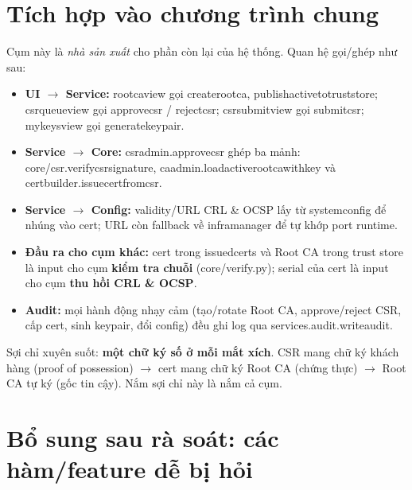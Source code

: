 \documentclass[12pt,a4paper]{article}
\newcommand{\code}[1]{{\ttfamily\small\def\_{\textunderscore\discretionary{}{}{}}#1}}
\begin{document}
\section{Tích hợp vào chương trình chung}

Cụm này là \emph{nhà sản xuất} cho phần còn lại của hệ thống. Quan hệ gọi/ghép
như sau:

\begin{itemize}
  \item \textbf{UI $\to$ Service:} \code{root\_ca\_view} gọi \code{create\_root\_ca},
        \code{publish\_active\_to\_trust\_store}; \code{csr\_queue\_view} gọi
        \code{approve\_csr} / \code{reject\_csr}; \code{csr\_submit\_view} gọi
        \code{submit\_csr}; \code{my\_keys\_view} gọi \code{generate\_keypair}.
  \item \textbf{Service $\to$ Core:} \code{csr\_admin.approve\_csr} ghép ba mảnh:
        \code{core/csr.verify\_csr\_signature},
        \code{ca\_admin.load\_active\_root\_ca\_with\_key} và
        \code{cert\_builder.issue\_cert\_from\_csr}.
  \item \textbf{Service $\to$ Config:} validity/URL CRL \& OCSP lấy từ
        \code{system\_config} để nhúng vào cert; URL còn fallback về
        \code{infra\_manager} để tự khớp port runtime.
  \item \textbf{Đầu ra cho cụm khác:} cert trong \code{issued\_certs} và Root CA
        trong trust store là input cho cụm \textbf{kiểm tra chuỗi}
        (\code{core/verify.py}); serial của cert là input cho cụm \textbf{thu
        hồi CRL \& OCSP}.
  \item \textbf{Audit:} mọi hành động nhạy cảm (tạo/rotate Root CA, approve/reject
        CSR, cấp cert, sinh keypair, đổi config) đều ghi log qua
        \code{services.audit.write\_audit}.
\end{itemize}

\begin{notebox}
Sợi chỉ xuyên suốt: \textbf{một chữ ký số ở mỗi mắt xích}. CSR mang chữ ký khách
hàng (proof of possession) $\to$ cert mang chữ ký Root CA (chứng thực) $\to$ Root
CA tự ký (gốc tin cậy). Nắm sợi chỉ này là nắm cả cụm.
\end{notebox}

\section{Bổ sung sau rà soát: các hàm/feature dễ bị hỏi}
\end{document}
